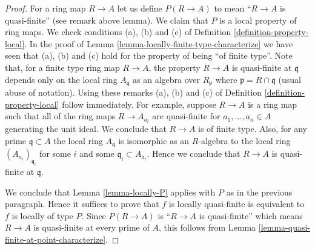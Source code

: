 \documentclass[10pt,a4paper]{amsart}
\theoremstyle{plain}
\theoremstyle{definition}
\theoremstyle{remark}
\numberwithin{equation}{subsection}
\begin{document}
\begin{proof}
For a ring map $R \to A$ let us define
$P(R \to A)$ to mean ``$R \to A$ is quasi-finite''
(see remark above lemma).
We claim that $P$ is a local property of ring maps.
We check conditions (a), (b) and (c) of Definition
\ref{definition-property-local}. In the proof of
Lemma \ref{lemma-locally-finite-type-characterize}
we have seen that (a), (b) and (c) hold for the property
of being ``of finite type''. Note that, for a finite type ring map
$R \to A$, the property $R \to A$ is quasi-finite at $\mathfrak q$
depends only on the local ring $A_{\mathfrak q}$ as an
algebra over $R_{\mathfrak p}$ where $\mathfrak p = R \cap \mathfrak q$
(usual abuse of notation). Using these remarks (a), (b) and (c) of
Definition \ref{definition-property-local} follow immediately.
For example, suppose $R \to A$ is a ring map
such that all of the ring maps $R \to A_{a_i}$ are quasi-finite
for $a_1, \ldots, a_n \in A$ generating the unit ideal.
We conclude that $R \to A$ is of finite type. Also, for any
prime $\mathfrak q \subset A$ the local ring $A_{\mathfrak q}$
is isomorphic as an $R$-algebra to the local ring
$(A_{a_i})_{\mathfrak q_i}$ for some $i$ and some
$\mathfrak q_i \subset A_{a_i}$. Hence we conclude that
$R \to A$ is quasi-finite at $\mathfrak q$.

\medskip\noindent
We conclude that Lemma \ref{lemma-locally-P} applies with $P$
as in the previous paragraph.
Hence it suffices to prove that $f$ is locally quasi-finite is
equivalent to $f$ is locally of type $P$. Since $P(R \to A)$
is ``$R \to A$ is quasi-finite'' which means $R \to A$ is
quasi-finite at every prime of $A$, this follows from
Lemma \ref{lemma-quasi-finite-at-point-characterize}.
\end{proof}
\end{document}
